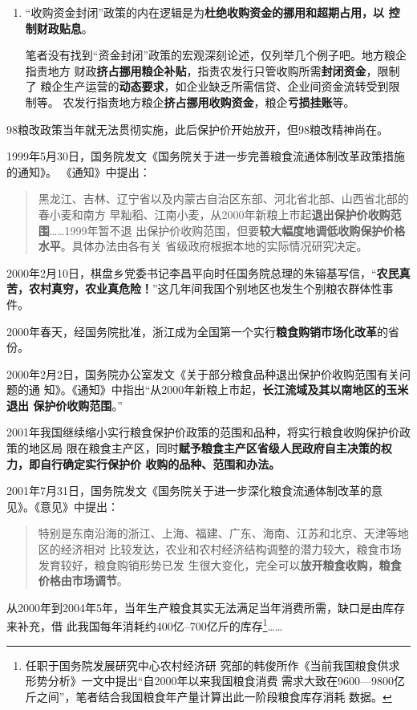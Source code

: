 \begin{enumerate}
\item “收购资金封闭”政策的内在逻辑是为\textbf{杜绝收购资金的挪用和超期占用，以
    控制财政贴息}。

  笔者没有找到“资金封闭”政策的宏观深刻论述，仅列举几个例子吧。地方粮企指责地方
  财政\textbf{挤占挪用粮企补贴}，指责农发行只管收购所需\textbf{封闭资金}，限制了
  粮企生产运营的\textbf{动态要求}，如企业缺乏所需信贷、企业间资金流转受到限制等。
  农发行指责地方粮企\textbf{挤占挪用收购资金}，粮企\textbf{亏损挂账}等。

\end{enumerate}

98粮改政策当年就无法贯彻实施，此后保护价开始放开，但98粮改精神尚在。

1999年5月30日，国务院发文《国务院关于进一步完善粮食流通体制改革政策措施的通知》。
《通知》中提出：
\begin{quotation}
  黑龙江、吉林、辽宁省以及内蒙古自治区东部、河北省北部、山西省北部的春小麦和南方
  早籼稻、江南小麦，从2000年新粮上市起\textbf{退出保护价收购范围}……1999年暂不退
  出保护价收购范围，但要\textbf{较大幅度地调低收购保护价格水平}。具体办法由各有关
  省级政府根据本地的实际情况研究决定。
\end{quotation}

2000年2月10日，棋盘乡党委书记李昌平向时任国务院总理的朱镕基写信，“\textbf{农民真
  苦，农村真穷，农业真危险！}”这几年间我国个别地区也发生个别粮农群体性事件。

2000年春天，经国务院批准，浙江成为全国第一个实行\textbf{粮食购销市场化改革}的省
份。

2000年2月2日，国务院办公室发文《关于部分粮食品种退出保护价收购范围有关问题的通
知》。《通知》中指出“从2000年新粮上市起，\textbf{长江流域及其以南地区的玉米退出
  保护价收购范围}。”

2001年我国继续缩小实行粮食保护价政策的范围和品种，将实行粮食收购保护价政策的地区局
限在粮食主产区，同时\textbf{赋予粮食主产区省级人民政府自主决策的权力，即自行确定实行保护价
  收购的品种、范围和办法。}

2001年7月31日，国务院发文《国务院关于进一步深化粮食流通体制改革的意
见》。《意见》中提出：
\begin{quotation}
  特别是东南沿海的浙江、上海、福建、广东、海南、江苏和北京、天津等地区的经济相对
  比较发达，农业和农村经济结构调整的潜力较大，粮食市场发育较好，粮食购销形势已发
  生很大变化，完全可以\textbf{放开粮食收购，粮食价格由市场调节}。
\end{quotation}


从2000年到2004年5年，当年生产粮食其实无法满足当年消费所需，缺口是由库存来补充，借
此我国每年消耗约400亿--700亿斤的库存\footnote{任职于国务院发展研究中心农村经济研
  究部的韩俊所作《当前我国粮食供求形势分析》一文中提出“自2000年以来我国粮食消费
  需求大致在9600—9800亿斤之间”，笔者结合我国粮食年产量计算出此一阶段粮食库存消耗
  数据。}……


